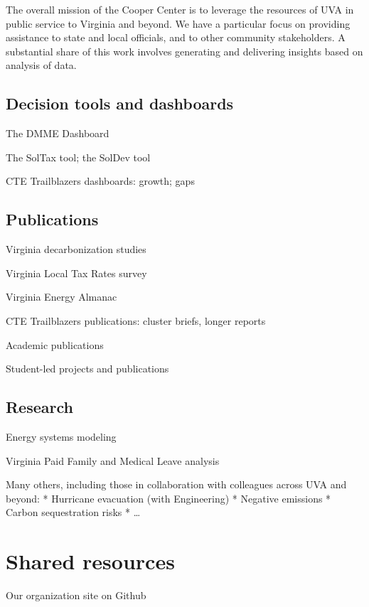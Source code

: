 \documentclass[
]{book}
\begin{document}
The overall mission of the Cooper Center is to leverage the resources of UVA in public service to Virginia and beyond. We have a particular focus on providing assistance to state and local officials, and to other community stakeholders. A substantial share of this work involves generating and delivering insights based on analysis of data.

\hypertarget{decision-tools-and-dashboards}{%
\subsection{Decision tools and dashboards}\label{decision-tools-and-dashboards}}

The DMME Dashboard

The SolTax tool; the SolDev tool

CTE Trailblazers dashboards: growth; gaps

\hypertarget{publications}{%
\subsection{Publications}\label{publications}}

Virginia decarbonization studies

Virginia Local Tax Rates survey

Virginia Energy Almanac

CTE Trailblazers publications: cluster briefs, longer reports

Academic publications

Student-led projects and publications

\hypertarget{research}{%
\subsection{Research}\label{research}}

Energy systems modeling

Virginia Paid Family and Medical Leave analysis

Many others, including those in collaboration with colleagues across UVA and beyond:
* Hurricane evacuation (with Engineering)
* Negative emissions
* Carbon sequestration risks
* \ldots{}

\hypertarget{shared-resources}{%
\section{Shared resources}\label{shared-resources}}

Our organization site on Github
\end{document}
